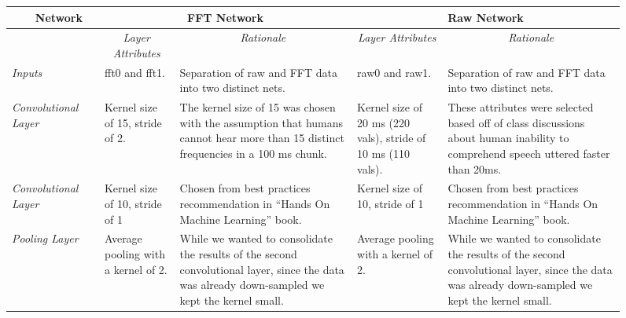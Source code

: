 \documentclass[11pt]{article}
\begin{document}
\begin{figure}[H]
\begin{adjustwidth}{-10cm}{}
\begin{table}[H]
\centering
\begin{tabular}{p{0.75in}l|p{0.65in}|p{1.5in}|p{0.65in}|p{1.5in}|}
\hline
\multicolumn{1}{r}{Network}    &  & \multicolumn{2}{c|}{\textbf{FFT Network}}                                               & \multicolumn{2}{c|}{\textbf{Raw Network}}                                               \\ \hline
                               &  & \multicolumn{1}{c|}{\textit{Layer Attributes}} & \multicolumn{1}{c|}{\textit{Rationale}} & \multicolumn{1}{c|}{\textit{Layer Attributes}} & \multicolumn{1}{c|}{\textit{Rationale}} \\ \hline
\textit{Inputs}                &  & fft0 and fft1.                                              & Separation of raw and FFT data into two distinct nets.                                       & raw0 and raw1.                                           & Separation of raw and FFT data into two distinct nets.                                       \\ \hline
\textit{Convolutional Layer}   &  & Kernel size of 15, stride of 2.                                              & The kernel size of 15 was chosen with the assumption that humans cannot hear more than 15 distinct frequencies in a 100 ms chunk.                                       & Kernel size of 20 ms (220 vals), stride of 10 ms (110 vals).                                              & These attributes were selected based off of class discussions about human inability to comprehend speech uttered faster than 20ms.                                     \\ \hline
\textit{Convolutional Layer}   &  & Kernel size of 10, stride of 1                                              & Chosen from best practices recommendation in ``Hands On Machine Learning'' book.  & Kernel size of 10, stride of 1                                              & Chosen from best practices recommendation in ``Hands On Machine Learning'' book.                               \\ \hline
\textit{Pooling Layer}         &  & Average pooling with a kernel of 2.                                             & While we wanted to consolidate the results of the second convolutional layer, since the data was already down-sampled we kept the kernel small.                                      & Average pooling with a kernel of 2.                                           & While we wanted to consolidate the results of the second convolutional layer, since the data was already down-sampled we kept the kernel small.                                    \\ \hline

\end{tabular}
\end{table}
\end{adjustwidth}
\end{figure}
\end{document}
